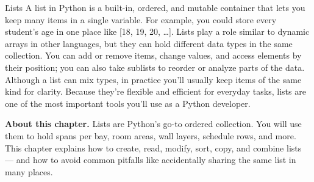 
\h{Lists}
A list in Python is a built-in, ordered, and mutable container that lets you keep many items in a single variable. For example, you could store every student’s age in one place like [18, 19, 20, …]. Lists play a role similar to dynamic arrays in other languages, but they can hold different data types in the same collection. You can add or remove items, change values, and access elements by their position; you can also take sublists to reorder or analyze parts of the data. Although a list can mix types, in practice you’ll usually keep items of the same kind for clarity. Because they’re flexible and efficient for everyday tasks, lists are one of the most important tools you’ll use as a Python developer.
\medskip
\begin{NoteBox}
\textbf{About this chapter.} Lists are Python's go-to ordered collection. You will use them to
hold spans per bay, room areas, wall layers, schedule rows, and more. This chapter explains how
to create, read, modify, sort, copy, and combine lists --- and how to avoid common pitfalls like
accidentally sharing the same list in many places.
\end{NoteBox}
\medskip

